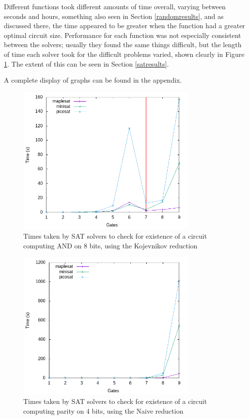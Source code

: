 \documentclass{article}
\begin{document}
Different functions took different amounts of time overall, varying between seconds and hours, something also seen in Section \ref{randomresults}, and as discussed there, the time appeared to be greater when the function had a greater optimal circuit size. Performance for each function was not especially consistent between the solvers; usually they found the same things difficult, but the length of time each solver took for the difficult problems varied, shown clearly in Figure \ref{fig:8and_kulikov}. The extent of this can be seen in Section \ref{satresults}.

A complete display of graphs can be found in the appendix.

\begin{figure}[h!]
  \centering
  \includegraphics[width=0.8\textwidth]{images/times/8and_kulikov.png}
  \caption{Times taken by SAT solvers to check for existence of a circuit computing AND on 8 bits, using the Kojevnikov reduction\label{fig:8and_kulikov}}
\end{figure}

\clearpage

\begin{figure}[h!]
  \centering
\includegraphics[width=0.8\textwidth]{images/times/4parity_naive.png}
\caption{Times taken by SAT solvers to check for existence of a circuit computing parity on 4 bits, using the Naive reduction\label{fig:4parity_naive}}
\end{figure}
\end{document}
